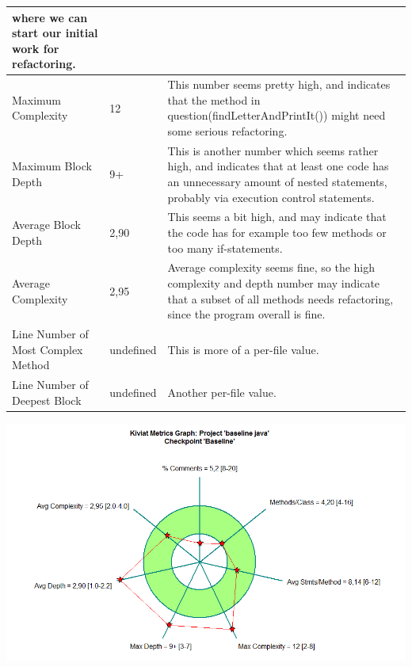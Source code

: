 \documentclass{article}
\begin{document}
{\begin{center}
\begin{tabulary}{1.0\textwidth}{| P{3cm} | P{2.7cm} | p{8.5cm} |}
	where we can start our initial work for refactoring.\\ \hline
	Maximum Complexity & 12 & This number seems pretty high, and indicates that the 
	method in question(findLetterAndPrintIt()) might need some serious refactoring.\\ \hline
	Maximum Block Depth & 9+ & This is another number which seems rather high, and 
	indicates that at least one code has an unnecessary amount of nested statements,
	probably via execution control statements.\\ \hline
	Average Block Depth & 2,90 & This seems a bit high, and may indicate that the
	code has for example too few methods or too many if-statements.\\ \hline
	Average Complexity & 2,95 & Average complexity seems fine, so the high complexity
	and depth number may indicate that a subset of all methods needs refactoring, since
	the program overall is fine.\\ \hline
	Line Number of Most Complex Method & undefined & This is more of a per-file value.\\ \hline
	Line Number of Deepest Block & undefined & Another per-file value. \\ \hline
\end{tabulary}
\end{center}
}%
\begin{center}
\includegraphics[height=8cm,width=14cm]{Hangman-Kiviat-before.png}
\end{center}
\pagebreak
\end{document}
